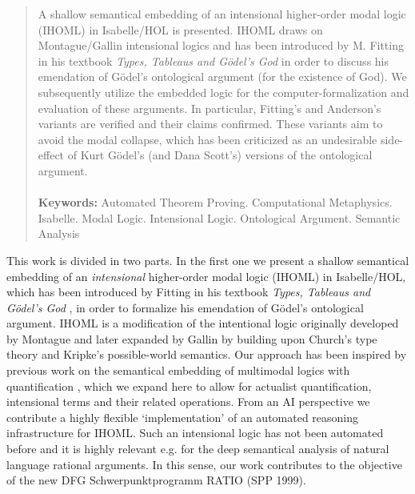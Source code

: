 %
\begin{isabellebody}%
%
%
%
%
%
%
%
%
\begin{isamarkuptext}%
\begin{abstract}
  A shallow semantical embedding of an intensional higher-order modal logic (IHOML) in Isabelle/HOL is presented.
  IHOML draws on Montague/Gallin intensional logics and has been introduced by M. Fitting in his textbook
  \emph{Types, Tableaus and G\"odel's God} in order to discuss his emendation of G\"odel's ontological argument
  (for the existence of God). We subsequently	utilize the embedded logic for the computer-formalization and evaluation
  of these arguments. In particular, Fitting's and Anderson's variants are verified and their claims confirmed.
  These variants aim to avoid the modal collapse, which has been criticized as
  an undesirable side-effect of Kurt G\"odel's (and Dana Scott's) versions of the ontological argument.
\\ \\
  \textbf{Keywords:} Automated Theorem Proving. Computational Metaphysics. Isabelle. Modal Logic.
	Intensional Logic. Ontological Argument. Semantic Analysis
\end{abstract}%
\end{isamarkuptext}\isamarkuptrue%
%
\isamarkuptrue%
%
\begin{isamarkuptext}%
This work is divided in two parts. In the first one we present a shallow semantical embedding of
an \emph{intensional} higher-order modal logic (IHOML) in Isabelle/HOL,
which has been introduced by Fitting in his textbook \emph{Types, Tableaus and G\"odel's God} \cite{Fitting}, in order
to formalize his emendation of G\"odel's ontological argument. IHOML is a modification of the
intentional logic originally developed by Montague and later expanded by Gallin \cite{Gallin75} by building upon Church's
type theory and Kripke's possible-world semantics. Our approach has been inspired by previous work on the semantical embedding of
multimodal logics with quantification \cite{J23}, which we expand here to allow for actualist quantification,
intensional terms and their related operations.
From an AI perspective we contribute a highly flexible `implementation' of an automated reasoning infrastructure for IHOML.
Such an intensional logic has not been automated before and it is highly relevant e.g. for the deep semantical analysis of
natural language rational arguments. In this sense, our work contributes to the objective
of the new DFG Schwerpunktprogramm RATIO (SPP 1999).%

\end{isamarkuptext}
\end{isabellebody}
